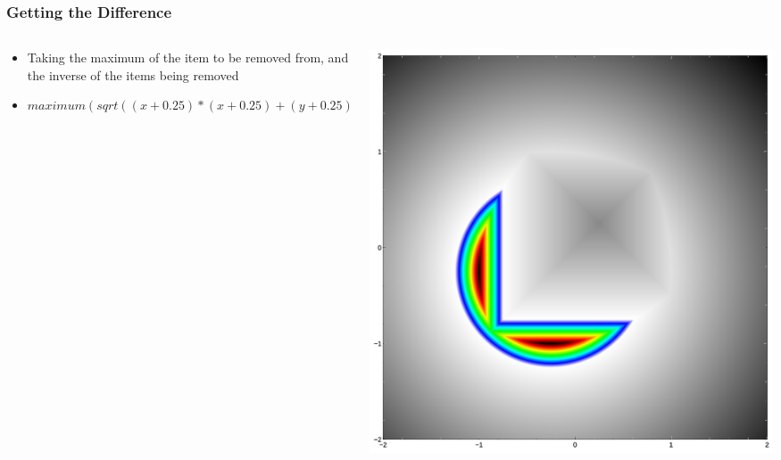 \documentclass{beamer}
\begin{document}
\begin{frame}
\frametitle{Getting the Difference}
\begin{columns}
  \begin{column}{0.65\textwidth}
    \begin{itemize}
    \item Taking the maximum of the item to be removed from, and the inverse of the items being removed
    \item $maximum(sqrt((x+0.25)*(x+0.25)+(y+0.25)*(y+0.25))-1,-(maximum(abs(x-0.25),abs(y-0.25)))-1)$
    \end{itemize}
  \end{column}
  \begin{column}{0.35\textwidth}
    \includegraphics[width=1.0\textwidth, right]{implicit_difference_square_circle.jpg}
  \end{column}
\end{columns}
\end{frame}
\end{document}

